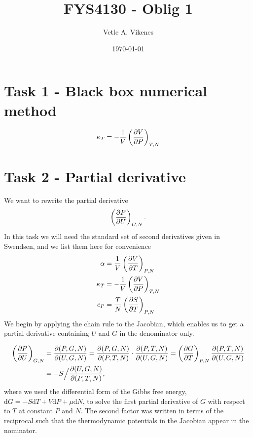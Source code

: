\documentclass[reprint,english,notitlepage,aps,nobalancelastpage,nofootinbib]{revtex4-1}
\newcommand{\closed}[1]{\left(#1\right)}
\newcommand{\kt}{\kappa_T}
\renewcommand{\cp}{c_P}
\renewcommand{\a}{\alpha}
\newcommand{\tmdv}[4]{\closed{\pdv{#1}{#2}}_{#3,#4}}
\newcommand{\jacobian}[2]{\pdv{(#1)}{(#2)}}
\begin{document}
\begin{center}
\title{\Huge FYS4130 - Oblig 1}
\author{\large Vetle A. Vikenes}
\date{\today}
\noaffiliation


\maketitle
\end{center}
\onecolumngrid

\section*{\large Task 1 - Black box numerical method}

\begin{align} \label{eq:kappa black box}
	\kt = -\frac{1}{V}\closed{\pdv{V}{P}}_{T,N}
\end{align}


\section*{\large Task 2 - Partial derivative}
We want to rewrite the partial derivative 
\begin{align*}
	\tmdv{P}{U}{G}{N}.
\end{align*}
In this task we will need the standard set of second derivatives given in Swendsen, and we list them here for convenience
\begin{align}
	\a &= \frac{1}{V} \tmdv{V}{T}{P}{N} \label{eq:alpha} \\ 
	\kt &= -\frac{1}{V} \tmdv{V}{P}{T}{N} \label{eq:kappa} \\ 
	\cp &= \frac{T}{N} \tmdv{S}{T}{P}{N} \label{eq:cp} \\ 
\end{align}
We begin by applying the chain rule to the Jacobian, which enables us to get a partial derivative containing $U$ and $G$ in the denominator only. 

\begin{align} 
	\tmdv{P}{U}{G}{N} &= \jacobian{P,G,N}{U,G,N} = \jacobian{P,G,N}{P,T,N}\cdot\jacobian{P,T,N}{U,G,N}= \tmdv{G}{T}{P}{N} \jacobian{P,T,N}{U,G,N} \nonumber \\
	&= -S \Big/\jacobian{U,G,N}{P,T,N}, \label{eq:pdv first expansion}
\end{align}
where we used the differential form of the Gibbs free energy, $\mathrm{d}G=-S\mathrm{d}T+V\mathrm{d}P+\mu\mathrm{d}N$, to solve the first partial derivative of $G$ with respect to $T$ at constant $P$ and $N$. The second factor was written in terms of the reciprocal such that the thermodynamic potentials in the Jacobian appear in the nominator. 
\end{document}
